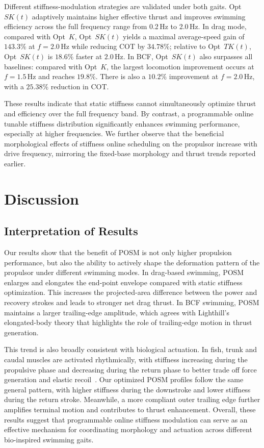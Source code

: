 Different stiffness-modulation strategies are validated under both gaits. Opt~\(SK(t)\) adaptively maintains higher effective thrust and improves swimming efficiency across the full frequency range from 0.2\,Hz to 2.0\,Hz. In drag mode, compared with Opt~\(K\), Opt~\(SK(t)\) yields a maximal average-speed gain of \(143.3\%\) at \(f{=}2.0\,\mathrm{Hz}\) while reducing COT by \(34.78\%\); relative to Opt~\(TK(t)\), Opt~\(SK(t)\) is \(18.6\%\) faster at \(2.0\,\mathrm{Hz}\). In BCF, Opt~\(SK(t)\) also surpasses all baselines: compared with Opt~\(K\), the largest locomotion improvement occurs at \(f{=}1.5\,\mathrm{Hz}\) and reaches \(19.8\%\). There is also a \(10.2\%\) improvement at \(f{=}2.0\,\mathrm{Hz}\), with a \(25.38\%\) reduction in COT.

These results indicate that static stiffness cannot simultaneously optimize thrust and efficiency over the full frequency band. By contrast, a programmable online tunable stiffness distribution significantly enhances swimming performance, especially at higher frequencies. We further observe that the beneficial morphological effects of stiffness online scheduling on the propulsor increase with drive frequency, mirroring the fixed-base morphology and thrust trends reported earlier.

\section{Discussion}
\label{sec:POSM_discussion}

\subsection{Interpretation of Results}

Our results show that the benefit of POSM is not only higher propulsion performance, but also the ability to actively shape the deformation pattern of the propulsor under different swimming modes. In drag-based swimming, POSM enlarges and elongates the end-point envelope compared with static stiffness optimization. This increases the projected-area difference between the power and recovery strokes and leads to stronger net drag thrust. In BCF swimming, POSM maintains a larger trailing-edge amplitude, which agrees with Lighthill's elongated-body theory that highlights the role of trailing-edge motion in thrust generation.

This trend is also broadly consistent with biological actuation. In fish, trunk and caudal muscles are activated rhythmically, with stiffness increasing during the propulsive phase and decreasing during the return phase to better trade off force generation and elastic recoil~\cite{cromie_lear_biomechanical_2020}. Our optimized POSM profiles follow the same general pattern, with higher stiffness during the downstroke and lower stiffness during the return stroke. Meanwhile, a more compliant outer trailing edge further amplifies terminal motion and contributes to thrust enhancement. Overall, these results suggest that programmable online stiffness modulation can serve as an effective mechanism for coordinating morphology and actuation across different bio-inspired swimming gaits.

